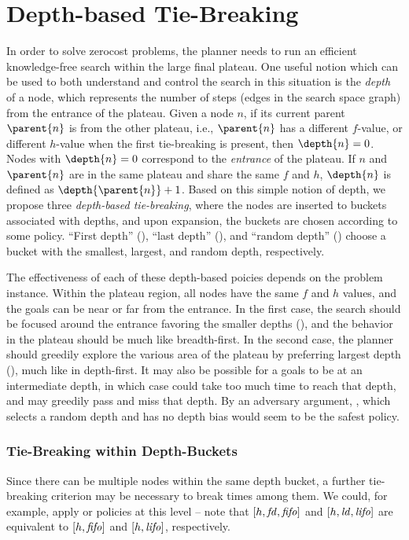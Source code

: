 \section{Depth-based Tie-Breaking}

In order to solve zerocost problems, the planner needs to run an
efficient knowledge-free search within the large final plateau.
One useful notion which can be used to both understand and control the
search in this situation is the \emph{depth} of a node, which represents
the number of steps (edges in the search space graph) from the entrance of the plateau.  Given a node $n$,
if its current parent $\parent{n}$ is from the other plateau, i.e.,
$\parent{n}$ has a different $f$-value, or different $h$-value when the
first tie-breaking is present, then $\depth{n} = 0$. Nodes with
$\depth{n} = 0$ correspond to the \emph{entrance} of the plateau.  If $n$
and $\parent{n}$ are in the same plateau and share the same $f$ and $h$,
$\depth{n}$ is defined as $\depth{\parent{n}} + 1$.  Based on this
simple notion of depth, we propose three \emph{depth-based
tie-breaking}, where the nodes are inserted to buckets associated with
depths, and upon expansion, the buckets are chosen according to some policy.
``First depth'' (\fd), ``last depth'' (\ld), and ``random depth'' (\rd) 
choose a bucket with the smallest,
largest, and random depth, respectively.

The effectiveness of each of these depth-based poicies depends on the
problem instance.  Within
the plateau region, all nodes have the same $f$ and $h$ values, 
and the goals can be near or far
from the entrance.  In the first case, the
search should be focused around the entrance favoring the smaller depths
(\fd), and the behavior in the plateau should be much like breadth-first. In the
second case, the planner should greedily explore the various area of the
plateau by preferring largest depth (\ld), much like in
depth-first. 
It may also be possible for a goals to be at an intermediate depth, in which case
\fd could take too much time to reach that
depth, and \ld may greedily pass and miss that depth.
By an adversary argument, \rd, which selects a random depth and has no depth bias would seem to be the safest policy.


\subsubsection{Tie-Breaking within Depth-Buckets} %
Since there can be multiple nodes within the same depth bucket,
a further tie-breaking criterion may be necessary to break times among them.
We could, for example, apply \lifo or \fifo policies at this level -- 
note that $[h,\mbox{\textit{fd}},\mbox{\textit{fifo}}]$ and $[h,\mbox{\textit{ld}},\mbox{\textit{lifo}}]$ are equivalent to $[h,\mbox{\textit{fifo}}]$ and $[h,\mbox{\textit{lifo}}]$, respectively.

